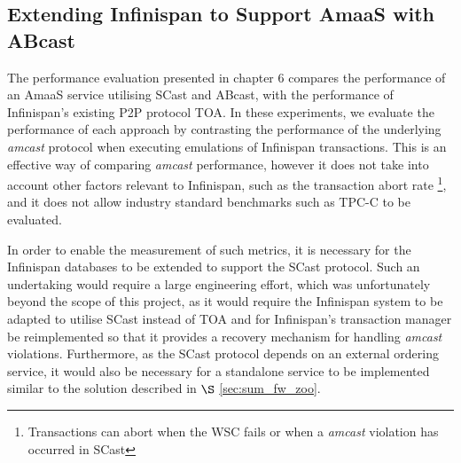     \subsection{Extending Infinispan to Support AmaaS with ABcast}
    The performance evaluation presented in chapter 6 compares the performance of an \textsf{AmaaS} service utilising \textsf{SCast} and \textsf{ABcast}, with the performance of Infinispan's existing P2P protocol TOA.  In these experiments, we evaluate the performance of each approach by contrasting the performance of the underlying \emph{amcast} protocol when executing emulations of Infinispan transactions.  This is an effective way of comparing \emph{amcast} performance, however it does not take into account other factors relevant to Infinispan, such as the transaction abort rate \footnote{Transactions can abort when the WSC fails or when a \emph{amcast} violation has occurred in \textsf{SCast}}, and it does not allow industry standard benchmarks such as TPC-C \citep{TPC-C} to be evaluated.  
    
    In order to enable the measurement of such metrics, it is necessary for the Infinispan databases to be extended to support the \textsf{SCast} protocol.  Such an undertaking would require a large engineering effort, which was unfortunately beyond the scope of this project, as it would require the Infinispan system to be adapted to utilise \textsf{SCast} instead of \textsf{TOA} and for Infinispan's transaction manager be reimplemented so that it provides a recovery mechanism for handling \emph{amcast} violations.  Furthermore, as the \textsf{SCast} protocol depends on an external ordering service, it would also be necessary for a standalone service to be implemented similar to the solution described in $\S$ \ref{sec:sum_fw_zoo}.  
